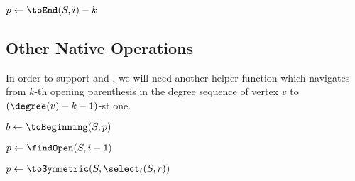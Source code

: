 \begin{algorithm}
\begin{algorithmic}
	\State $p \gets \toEnd(S, i) - k$
	\State {}
\EndFunction
\end{algorithmic}
\end{algorithm}

\subsection{Other Native Operations}

\begin{algorithm}
\begin{algorithmic}
	\State {}
\EndFunction
\end{algorithmic}
\end{algorithm}

\begin{algorithm}
\begin{algorithmic}
	\State {}
\EndFunction
\end{algorithmic}
\end{algorithm}

In order to support \dfudsRank{} and \dfudsSelect{}, we will need another helper function \toSymmetric{} which navigates from $k$-th opening parenthesis in the degree sequence of vertex $v$ to $(\degree(v) - k - 1)$-st one.

\begin{algorithm}
\begin{algorithmic}
	\State $b \gets \toBeginning(S, p)$
	\State {}
\EndFunction
\end{algorithmic}
\end{algorithm}

\begin{algorithm}
\begin{algorithmic}
		\State {}
	\Else
		\State $p \gets \findOpen(S, i - 1)$
		\State {}
	\EndIf
\EndFunction
\end{algorithmic}
\end{algorithm}

\begin{algorithm}
\begin{algorithmic}
		\State {}
	\Else
		\State $p \gets \toSymmetric(S, \select_((S, r))$
		\State {}
	\EndIf
\EndFunction
\end{algorithmic}
\end{algorithm}

